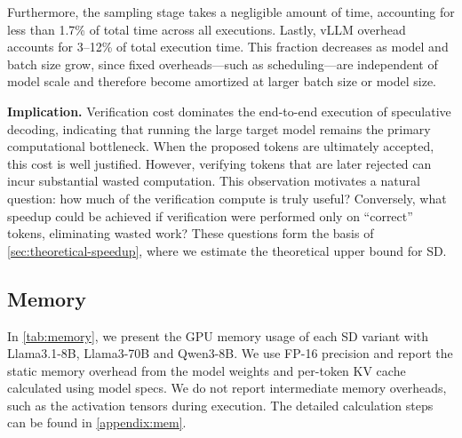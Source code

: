 Furthermore, the sampling stage takes a negligible amount of time, accounting for less than 1.7\% of total time across all executions. 
Lastly, vLLM overhead accounts for 3–12\% of total execution time. This fraction decreases as model and batch size grow, since fixed overheads—such as scheduling—are independent of model scale and therefore become amortized at larger batch size or model size.

\textbf{Implication.} Verification cost dominates the end-to-end execution of speculative decoding, indicating that running the large target model remains the primary computational bottleneck. When the proposed tokens are ultimately accepted, this cost is well justified. However, verifying tokens that are later rejected can incur substantial wasted computation. This observation motivates a natural question: how much of the verification compute is truly useful? Conversely, what speedup could be achieved if verification were performed only on “correct” tokens, eliminating wasted work? These questions form the basis of \autoref{sec:theoretical-speedup}, where we estimate the theoretical upper bound for SD.

\subsection{Memory}
In \autoref{tab:memory}, we present the GPU memory usage of each SD variant with Llama3.1-8B, Llama3-70B and Qwen3-8B.
We use FP-16 precision and report the static memory overhead from the model weights and per-token KV cache calculated using model specs. We do not report intermediate memory overheads, such as the activation tensors during execution. The detailed calculation steps can be found in \autoref{appendix:mem}.

